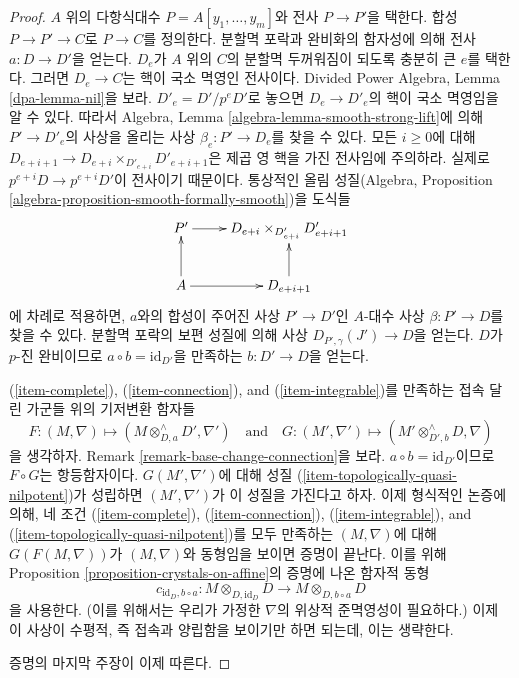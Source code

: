\begin{proof}
$A$ 위의 다항식대수 $P = A[y_1, \ldots, y_m]$와 전사
$P \to P'$을 택한다. 합성 $P \to P' \to C$로 $P \to C$를
정의한다. 분할멱 포락과 완비화의 함자성에 의해 전사
$a : D \to D'$을 얻는다. $D_e$가 $A$ 위의 $C$의 분할멱
두꺼워짐이 되도록 충분히 큰 $e$를 택한다. 그러면
$D_e \to C$는 핵이 국소 멱영인 전사이다. Divided Power Algebra,
Lemma \ref{dpa-lemma-nil}을 보라. $D'_e = D'/p^eD'$로 놓으면
$D_e \to D'_e$의 핵이 국소 멱영임을 알 수 있다. 따라서 Algebra,
Lemma \ref{algebra-lemma-smooth-strong-lift}에 의해 $P' \to D'_e$의
사상을 올리는 사상 $\beta_e : P' \to D_e$를 찾을 수 있다.
모든 $i \geq 0$에 대해
$D_{e + i + 1} \to D_{e + i} \times_{D'_{e + i}} D'_{e + i + 1}$은
제곱 영 핵을 가진 전사임에 주의하라. 실제로
$p^{e + i}D \to p^{e + i}D'$이 전사이기 때문이다. 통상적인
올림 성질(Algebra, Proposition
\ref{algebra-proposition-smooth-formally-smooth})을 도식들
$$
\xymatrix{
P' \ar[r] & D_{e + i} \times_{D'_{e + i}} D'_{e + i + 1} \\
A \ar[u] \ar[r] & D_{e + i + 1} \ar[u]
}
$$
에 차례로 적용하면, $a$와의 합성이 주어진 사상
$P' \to D'$인 $A$-대수 사상 $\beta : P' \to D$를 찾을 수 있다.
분할멱 포락의 보편 성질에 의해 사상
$D_{P', \gamma}(J') \to D$을 얻는다. $D$가 $p$-진 완비이므로
$a \circ b = \text{id}_{D'}$을 만족하는 $b : D' \to D$을 얻는다.

\medskip\noindent
(\ref{item-complete}), (\ref{item-connection}), and
(\ref{item-integrable})를 만족하는 접속 달린 가군들 위의
기저변환 함자들
$$
F : (M, \nabla) \longmapsto
(M \otimes^\wedge_{D, a} D', \nabla')
\quad\text{and}\quad
G : (M', \nabla') \longmapsto
(M' \otimes^\wedge_{D', b} D, \nabla)
$$
을 생각하자. Remark \ref{remark-base-change-connection}을 보라.
$a \circ b = \text{id}_{D'}$이므로 $F \circ G$는 항등함자이다.
$G(M', \nabla')$에 대해 성질 (\ref{item-topologically-quasi-nilpotent})가
성립하면 $(M', \nabla')$가 이 성질을 가진다고 하자. 이제 형식적인
논증에 의해, 네 조건 (\ref{item-complete}), (\ref{item-connection}),
(\ref{item-integrable}), and (\ref{item-topologically-quasi-nilpotent})를
모두 만족하는 $(M, \nabla)$에 대해 $G(F(M, \nabla))$가
$(M, \nabla)$와 동형임을 보이면 증명이 끝난다. 이를 위해
Proposition \ref{proposition-crystals-on-affine}의 증명에 나온 함자적 동형
$$
c_{\text{id}_D, b \circ a} :
M \otimes_{D, \text{id}_D} D
\longrightarrow
M \otimes_{D, b \circ a} D
$$
을 사용한다. (이를 위해서는 우리가 가정한 $\nabla$의 위상적
준멱영성이 필요하다.) 이제 이 사상이 수평적, 즉 접속과 양립함을
보이기만 하면 되는데, 이는 생략한다.

\medskip\noindent
증명의 마지막 주장이 이제 따른다.
\end{proof}

